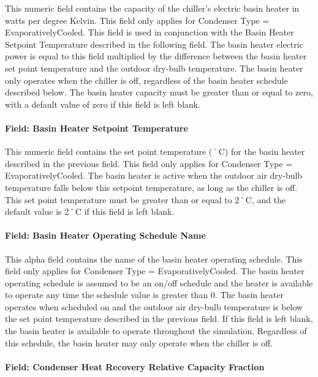 This numeric field contains the capacity of the chiller's electric basin heater in watts per degree Kelvin. This field only applies for Condenser Type = EvaporativelyCooled. This field is used in conjunction with the Basin Heater Setpoint Temperature described in the following field. The basin heater electric power is equal to this field multiplied by the difference between the basin heater set point temperature and the outdoor dry-bulb temperature. The basin heater only operates when the chiller is off, regardless of the basin heater schedule described below. The basin heater capacity must be greater than or equal to zero, with a default value of zero if this field is left blank.

\paragraph{Field: Basin Heater Setpoint Temperature}\label{field-basin-heater-setpoint-temperature-1-001}

This numeric field contains the set point temperature (˚C) for the basin heater described in the previous field. This field only applies for Condenser Type = EvaporativelyCooled. The basin heater is active when the outdoor air dry-bulb temperature falls below this setpoint temperature, as long as the chiller is off. This set point temperature must be greater than or equal to 2˚C, and the default value is 2˚C if this field is left blank.

\paragraph{Field: Basin Heater Operating Schedule Name}\label{field-basin-heater-operating-schedule-name-1-001}

This alpha field contains the name of the basin heater operating schedule. This field only applies for Condenser Type = EvaporativelyCooled. The basin heater operating schedule is assumed to be an on/off schedule and the heater is available to operate any time the schedule value is greater than 0. The basin heater operates when scheduled on and the outdoor air dry-bulb temperature is below the set point temperature described in the previous field. If this field is left blank, the basin heater is available to operate throughout the simulation. Regardless of this schedule, the basin heater may only operate when the chiller is off.

\paragraph{Field: Condenser Heat Recovery Relative Capacity Fraction}\label{field-condenser-heat-recovery-relative-capacity-fraction}

